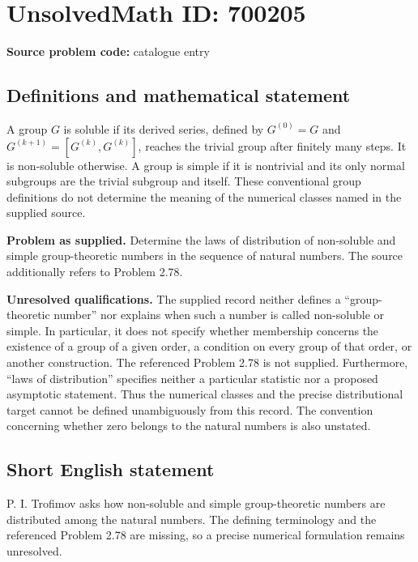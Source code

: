 \documentclass[11pt]{article}
\begin{document}
\section*{UnsolvedMath ID: 700205}
\textbf{Source problem code:} catalogue entry
\subsection{Definitions and mathematical statement}
A group \(G\) is soluble if its derived series, defined by \(G^{(0)}=G\) and \(G^{(k+1)}=[G^{(k)},G^{(k)}]\), reaches the trivial group after finitely many steps. It is non-soluble otherwise. A group is simple if it is nontrivial and its only normal subgroups are the trivial subgroup and itself. These conventional group definitions do not determine the meaning of the numerical classes named in the supplied source.

\textbf{Problem as supplied.} Determine the laws of distribution of non-soluble and simple group-theoretic numbers in the sequence of natural numbers. The source additionally refers to Problem 2.78.

\textbf{Unresolved qualifications.} The supplied record neither defines a ``group-theoretic number'' nor explains when such a number is called non-soluble or simple. In particular, it does not specify whether membership concerns the existence of a group of a given order, a condition on every group of that order, or another construction. The referenced Problem 2.78 is not supplied. Furthermore, ``laws of distribution'' specifies neither a particular statistic nor a proposed asymptotic statement. Thus the numerical classes and the precise distributional target cannot be defined unambiguously from this record. The convention concerning whether zero belongs to the natural numbers is also unstated.
\subsection{Short English statement}
P. I. Trofimov asks how non-soluble and simple group-theoretic numbers are distributed among the natural numbers. The defining terminology and the referenced Problem 2.78 are missing, so a precise numerical formulation remains unresolved.
\end{document}
